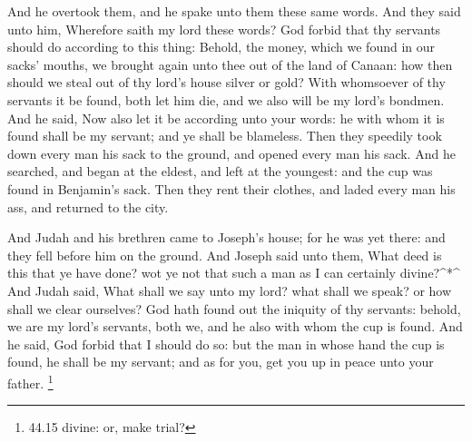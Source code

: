  And he overtook them, and he spake unto them these same
words.  And they said unto him, Wherefore saith my lord
these words? God forbid that thy servants should do according to this
thing:  Behold, the money, which we found in our sacks'
mouths, we brought again unto thee out of the land of Canaan: how then
should we steal out of thy lord's house silver or gold? 
With whomsoever of thy servants it be found, both let him die, and we
also will be my lord's bondmen.  And he said, Now also let
it be according unto your words: he with whom it is found shall be my
servant; and ye shall be blameless.  Then they speedily
took down every man his sack to the ground, and opened every man his
sack.  And he searched, and began at the eldest, and left
at the youngest: and the cup was found in Benjamin's sack. 
Then they rent their clothes, and laded every man his ass, and returned
to the city.

 And Judah and his brethren came to Joseph's house; for he
was yet there: and they fell before him on the ground.  And
Joseph said unto them, What deed is this that ye have done? wot ye not
that such a man as I can certainly divine?\^{}*\^{}  And
Judah said, What shall we say unto my lord? what shall we speak? or how
shall we clear ourselves? God hath found out the iniquity of thy
servants: behold, we are my lord's servants, both we, and he also with
whom the cup is found.  And he said, God forbid that I
should do so: but the man in whose hand the cup is found, he shall be my
servant; and as for you, get you up in peace unto your father.
\footnote{44.15 divine: or, make trial?}

